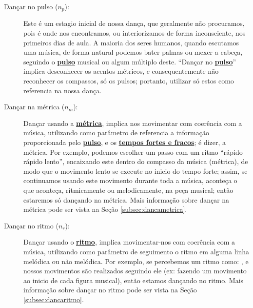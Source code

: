 \begin{description}

\item[Dançar no pulso ($n_p$):] Este é um estagio inicial de nossa dança, 
que geralmente não procuramos, 
pois é onde nos encontramos, ou interiorizamos de forma inconsciente, nos primeiros dias de aula.
A maioria dos seres humanos, quando escutamos uma música, 
de forma natural podemos bater palmas ou mexer a cabeça, 
seguindo o \hyperref[ref:Pulso]{\textbf{pulso}} musical ou algum múltiplo deste. 
``Dançar no \hyperref[ref:Pulso]{\textbf{pulso}}''
implica desconhecer os acentos métricos,
e consequentemente não reconhecer os compassos, só os pulsos;
portanto, utilizar só estos como referencia na nossa dança. 
\item[Dançar na métrica ($n_m$):] 
Dançar usando a \hyperref[def:Metrica]{\textbf{métrica}}, 
implica nos movimentar com coerência com a música, 
utilizando como parâmetro de referencia a informação proporcionada pelo \hyperref[ref:Pulso]{\textbf{pulso}}, 
e os \hyperref[subsec:acentuacion1]{\textbf{tempos fortes e fracos}}; é dizer, a métrica.
Por exemplo, podemos escolher um passo com um ritmo ``rápido rápido lento'',
encaixando este dentro do compasso da música (métrica),
de modo que o movimento lento se execute no inicio do tempo forte; 
assim, se continuamos usando este movimento durante toda a música,
aconteça o que aconteça, ritmicamente ou melodicamente, na peça musical;
então estaremos só dançando na métrica.
Mais informação sobre dançar na métrica pode ser vista na Seção \ref{subsec:dancametrica}.


\item[Dançar no ritmo  ($n_r$):] Dançar usando o \hyperref[sec:pos:Ritmo]{\textbf{ritmo}},
implica movimentar-nos com coerência com a música, 
utilizando como parâmetro de seguimento 
o ritmo em alguma linha melódica ou não melódica.
Por exemplo, se percebemos  um ritmo como: \Vier \Acht \Vier  \Acht \Vier \Halb,
e nossos movimentos são realizados seguindo ele 
(ex: fazendo um movimento ao inicio de cada figura musical), então estamos dançando no ritmo.
Mais informação sobre dançar no ritmo pode ser vista na Seção \ref{subsec:dancaritmo}.
 

\end{description}
